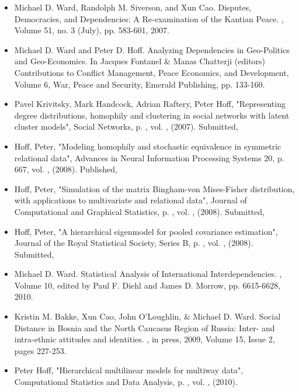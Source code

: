 \documentclass[pdftex,12pt,fullpage,oneside]{amsart}
\begin{document}
\begin{itemize}

\item Michael D. Ward, Randolph M. Siverson, and Xun Cao.
\newblock Disputes, Democracies, and Dependencies: A Re-examination of the Kantian Peace.
, Volume 51, no. 3 (July), pp. 583-601, 2007.

\item Michael D. Ward and Peter D. Hoff.
\newblock Analyzing Dependencies in Geo-Politics and Geo-Economics.
\newblock In Jacques Fontanel \& Manas Chatterji (editors) {\sc Contributions to Conflict Management, Peace Economics, and Development, Volume 6, War, Peace and Security}, Emerald Publishing, pp. 133-160.

\item  Pavel Krivitsky, Mark Handcock, Adrian Raftery, Peter Hoff, "Representing degree distributions, homophily and clustering in social networks
with latent cluster models", Social Networks, p. , vol. , (2007). Submitted,
\item  Hoff, Peter, "Modeling homophily and stochastic equivalence in symmetric relational data", Advances in Neural Information Processing
Systems 20, p. 667, vol. , (2008). Published,
\item  Hoff, Peter, "Simulation of the matrix Bingham-von Mises-Fisher distribution, with applications to multivariate and relational data", Journal of
Computational and Graphical Statistics, p. , vol. , (2008). Submitted,
\item  Hoff, Peter, "A hierarchical eigenmodel for pooled covariance estimation", Journal of the Royal Statistical Society, Series B, p. , vol. , (2008).
Submitted,

\item Michael D. Ward. 
\newblock Statistical Analysis of International Interdependencies.
, Volume 10, edited by 
Paul F. Diehl and James D. Morrow, pp. 6615-6628, 2010.

\item  Kristin M. Bakke, Xun Cao, John O'Loughlin, \& Michael D. Ward.
\newblock Social Distance in Bosnia and the North Caucasus Region of Russia: Inter-
and intra-ethnic attitudes and identities.
, in press, 2009, Volume 15, Issue 2, pages 227-253.

\item  Peter Hoff, "Hierarchical multilinear models for multiway data", Computational Statistics and Data Analysis, p. , vol. , (2010). 


\end{itemize}
\end{document}
